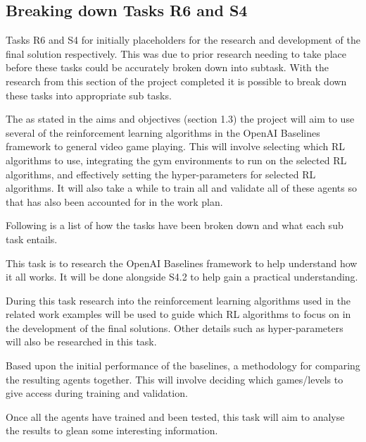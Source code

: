 \documentclass[a4paper]{article}
\begin{document}
\subsection{Breaking down Tasks R6 and S4}
Tasks R6 and S4 for initially placeholders for the research and development of the final solution respectively.
This was due to prior research needing to take place before these tasks could be accurately broken down into subtask.
With the research from this section of the project completed it is possible to break down these tasks into appropriate sub tasks.
\par
The as stated in the aims and objectives (section 1.3) the project will aim to use several of the reinforcement learning algorithms in the OpenAI Baselines framework to general video game playing.
This will involve selecting which RL algorithms to use, integrating the gym environments to run on the selected RL algorithms, and effectively setting the hyper-parameters for selected RL algorithms.
It will also take a while to train all and validate all of these agents so that has also been accounted for in the work plan.
\par
Following is a list of how the tasks have been broken down and what each sub task entails.
\begin{description}
\setlength{\itemsep}{0pt}
\setlength{\parskip}{0pt}
\item [\large{Research}]
\item [R6.1--Baselines Basic Research]
This task is to research the OpenAI Baselines framework to help understand how it all works.
It will be done alongside S4.2 to help gain a practical understanding.
\item [R6.2--Research effective RL Algorithms]
During this task research into the reinforcement learning algorithms used in the related work examples will be used to guide which RL algorithms to focus on in the development of the final solutions.
Other details such as hyper-parameters will also be researched in this task.
\item [R6.3--Select Final Comparison Methodology]
Based upon the initial performance of the baselines, a methodology for comparing the resulting agents together.
This will involve deciding which games/levels to give access during training and validation.
\item [R6.4--Analyse the Results]
Once all the agents have trained and been tested, this task will aim to analyse the results to glean some interesting information.
\end{description}
\end{document}
